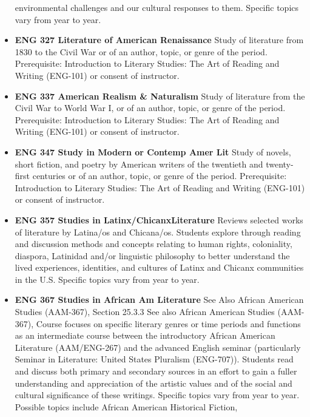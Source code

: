 \documentclass[
  letterpaper,
]{scrbook}
\begin{document}
\begin{itemize}
  environmental challenges and our cultural responses to them. Specific
  topics vary from year to year.\\
\item
  \textbf{ENG 327 Literature of American Renaissance} Study of
  literature from 1830 to the Civil War or of an author, topic, or genre
  of the period. Prerequisite: Introduction to Literary Studies: The Art
  of Reading and Writing (ENG-101) or consent of instructor.\\
\item
  \textbf{ENG 337 American Realism \& Naturalism} Study of literature
  from the Civil War to World War I, or of an author, topic, or genre of
  the period. Prerequisite: Introduction to Literary Studies: The Art of
  Reading and Writing (ENG-101) or consent of instructor.\\
\item
  \textbf{ENG 347 Study in Modern or Contemp Amer Lit} Study of novels,
  short fiction, and poetry by American writers of the twentieth and
  twenty-first centuries or of an author, topic, or genre of the period.
  Prerequisite: Introduction to Literary Studies: The Art of Reading and
  Writing (ENG-101) or consent of instructor.\\
\item
  \textbf{ENG 357 Studies in Latinx/ChicanxLiterature} Reviews selected
  works of literature by Latina/os and Chicana/os. Students explore
  through reading and discussion methods and concepts relating to human
  rights, coloniality, diaspora, Latinidad and/or linguistic philosophy
  to better understand the lived experiences, identities, and cultures
  of Latinx and Chicanx communities in the U.S. Specific topics vary
  from year to year.\\
\item
  \textbf{ENG 367 Studies in African Am Literature} See Also African
  American Studies (AAM-367), Section 25.3.3 See also African American
  Studies (AAM-367), Course focuses on specific literary genres or time
  periods and functions as an intermediate course between the
  introductory African American Literature (AAM/ENG-267) and the
  advanced English seminar (particularly Seminar in Literature: United
  States Pluralism (ENG-707)). Students read and discuss both primary
  and secondary sources in an effort to gain a fuller understanding and
  appreciation of the artistic values and of the social and cultural
  significance of these writings. Specific topics vary from year to
  year. Possible topics include African American Historical Fiction,

\end{itemize}
\end{document}
